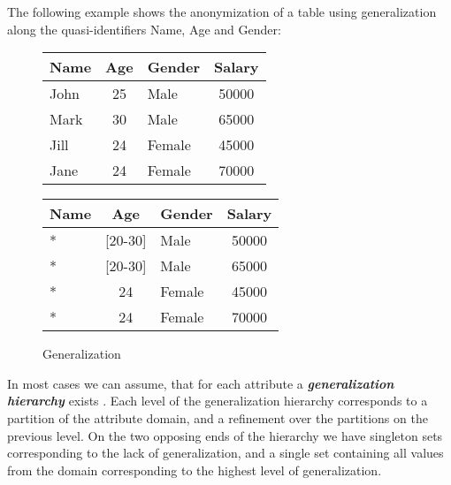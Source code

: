 The following example shows the anonymization of a table using generalization along the quasi-identifiers Name, Age and Gender:

\begin{figure}[H]
	\centering
	\begin{tabular}{|l|c|l|c|}
		\hline
		\textbf{Name} & \textbf{Age} & \textbf{Gender} & \textbf{Salary} \\
		\hline
		John & 25 & Male   & 50000 \\
		Mark & 30 & Male   & 65000 \\
		Jill & 24 & Female & 45000 \\
		Jane & 24 & Female & 70000 \\
		\hline
	\end{tabular}
	\quad
	\begin{tabular}{|l|c|l|c|}
		\hline
		\textbf{Name} & \textbf{Age} & \textbf{Gender} & \textbf{Salary} \\
		\hline
		* & [20-30] & Male   & 50000 \\
		* & [20-30] & Male   & 65000 \\
		* & 24      & Female & 45000 \\
		* & 24      & Female & 70000 \\
		\hline
	\end{tabular}
	\caption{Generalization}
	\label{fig:generalization}
\end{figure}


In most cases we can assume, that for each attribute a \textit{\textbf{generalization hierarchy}} exists \cite{aggarwal}. Each level of the generalization hierarchy corresponds to a partition of the attribute domain, and a refinement over the partitions on the previous level. \cite{samarati-sweeney} On the two opposing ends of the hierarchy we have singleton sets corresponding to the lack of generalization, and a single set containing all values from the domain corresponding to the highest level of generalization.


